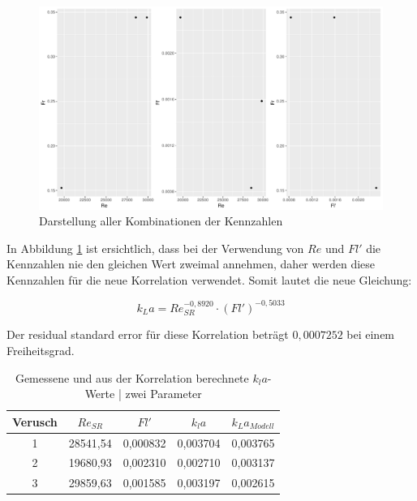 \documentclass[12pt,liststotoc]{report}
\begin{document}
\begin{figure}[H]
    \centering
    \includegraphics[width=1\textwidth]{Graphics/kennzahlen.pdf}
    \caption[Darstellung]{Darstellung aller Kombinationen der Kennzahlen}
    \label{fig:kennzahlen}
\end{figure}

In Abbildung \ref{fig:kennzahlen} ist ersichtlich, dass bei der Verwendung von $Re$ und $Fl'$ die Kennzahlen nie den gleichen Wert zweimal annehmen, daher werden diese Kennzahlen für die neue Korrelation verwendet. Somit lautet die neue Gleichung:

\begin{equation}
    k_La = Re_{SR}^{-0,8920} \cdot \left(Fl'\right)^{-0,5033}
\end{equation}

Der residual standard error für diese Korrelation beträgt $0,0007252$ bei einem Freiheitsgrad.

\begin{table}[H]
  \centering
  \caption{Gemessene und aus der Korrelation berechnete $k_la$-Werte | zwei Parameter}
    \begin{tabular}{ccccc}
    \toprule
    Verusch & $Re_{SR}$    & $Fl'$    & $k_la$   & $k_La_{Modell}$ \\
    \midrule
    1     & 28541,54 & 0,000832 & 0,003704 & 0,003765 \\
    2     & 19680,93 & 0,002310 & 0,002710 & 0,003137 \\
    3     & 29859,63 & 0,001585 & 0,003197 & 0,002615 \\
    \bottomrule
    \end{tabular}%
  \label{tab:korrelation-2param}%
\end{table}%
\end{document}
